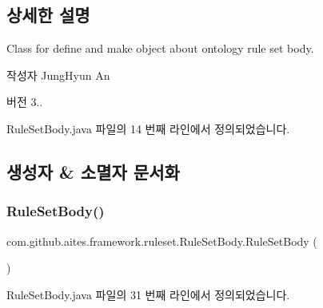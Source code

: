 \subsection{상세한 설명}
Class for define and make object about ontology rule set body. 

\begin{DoxyAuthor}{작성자}
Jung\+Hyun An 
\end{DoxyAuthor}
\begin{DoxyVersion}{버전}
3.. 
\end{DoxyVersion}


Rule\+Set\+Body.\+java 파일의 14 번째 라인에서 정의되었습니다.



\subsection{생성자 \& 소멸자 문서화}
\mbox{\label{classcom_1_1github_1_1aites_1_1framework_1_1ruleset_1_1_rule_set_body_a33c7fadaf1b5c3a032fb495296660ec9}} 
\subsubsection{\texorpdfstring{Rule\+Set\+Body()}{RuleSetBody()}}
{\footnotesize\ttfamily com.\+github.\+aites.\+framework.\+ruleset.\+Rule\+Set\+Body.\+Rule\+Set\+Body (\begin{DoxyParamCaption}{ }\end{DoxyParamCaption})}



Rule\+Set\+Body.\+java 파일의 31 번째 라인에서 정의되었습니다.


